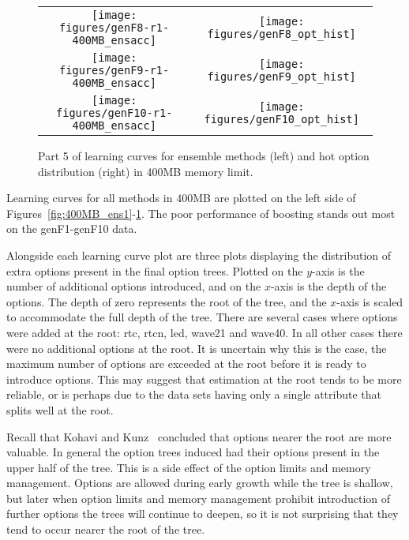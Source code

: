 \begin{figure}
\centering
\begin{tabular}{c@{}c}
\texttt{[image: figures/genF8-r1-400MB\_ensacc]} &
\texttt{[image: figures/genF8\_opt\_hist]} \\
\texttt{[image: figures/genF9-r1-400MB\_ensacc]} &
\texttt{[image: figures/genF9\_opt\_hist]} \\
\texttt{[image: figures/genF10-r1-400MB\_ensacc]} &
\texttt{[image: figures/genF10\_opt\_hist]} \\
\end{tabular}
\caption{Part 5 of learning curves for ensemble methods (left) and {\sc hot} option distribution (right) in 400MB memory limit.}
\label{fig:400MB_ens5}
\end{figure}

Learning curves for all methods in 400MB are plotted on the left side of  Figures~\ref{fig:400MB_ens1}-\ref{fig:400MB_ens5}. The poor performance of boosting stands out most on the {\sc genF1}-{\sc genF10} data.

Alongside each learning curve plot are three plots displaying the distribution of extra options present in the final option trees. 
Plotted on the $y$-axis is the number of additional options introduced, and on the $x$-axis is the depth of the options.
The depth of zero represents the root of the tree, and the $x$-axis is scaled to accommodate the full depth of the tree. There are several cases where options were added at the root: {\sc rtc}, {\sc rtcn}, {\sc led}, {\sc wave21} and {\sc wave40}. In all other cases there were no additional options at the root. It is uncertain why this is the case, the maximum number of options are exceeded at the root before it is ready to introduce options. This may suggest that estimation at the root tends to be more reliable, or is perhaps due to the data sets having only a single attribute that splits well at the root.

Recall that Kohavi and Kunz~\cite{kohaviot} concluded that options nearer the root are more valuable. In general the option trees induced had their options present in the upper half of the tree. This is a side effect of the option limits and memory management. Options are allowed during early growth while the tree is shallow, but later when option limits and memory management prohibit introduction of further options the trees will continue to deepen, so it is not surprising that they tend to occur nearer the root of the tree.

